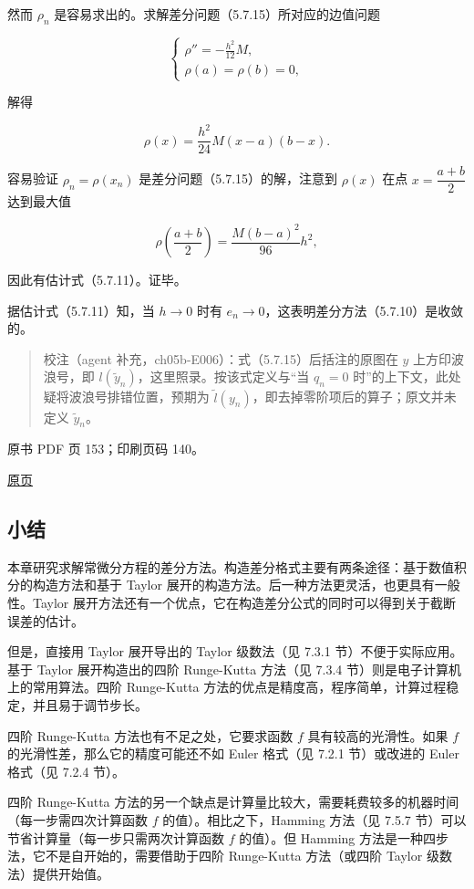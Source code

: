 然而 \(\rho_n\) 是容易求出的。求解差分问题（5.7.15）所对应的边值问题

\[
\begin{cases}
\displaystyle\rho''=-\frac{h^2}{12}M,\\[6pt]
\rho(a)=\rho(b)=0,
\end{cases}
\]

解得

\[
\rho(x)=\frac{h^2}{24}M(x-a)(b-x).
\]

容易验证 \(\rho_n=\rho(x_n)\) 是差分问题（5.7.15）的解，注意到 \(\rho(x)\) 在点 \(x=\dfrac{a+b}2\) 达到最大值

\[
\rho\left(\frac{a+b}2\right)=\frac{M(b-a)^2}{96}h^2,
\]

因此有估计式（5.7.11）。证毕。

据估计式（5.7.11）知，当 \(h\to0\) 时有 \(e_n\to0\)，这表明差分方法（5.7.10）是收敛的。

\begin{quote}
校注（agent 补充，ch05b-E006）：式（5.7.15）后括注的原图在 \(y\) 上方印波浪号，即 \(l(\tilde y_n)\)，这里照录。按该式定义与``当 \(q_n=0\) 时''的上下文，此处疑将波浪号排错位置，预期为 \(\tilde l(y_n)\)，即去掉零阶项后的算子；原文并未定义 \(\tilde y_n\)。
\end{quote}

\clearpage

原书 PDF 页 153；印刷页码 140。

\href{source-images/pdf-153.jpeg}{原页}

\subsection{小结}\label{ch05b-ux5c0fux7ed3}

本章研究求解常微分方程的差分方法。构造差分格式主要有两条途径：基于数值积分的构造方法和基于 Taylor 展开的构造方法。后一种方法更灵活，也更具有一般性。Taylor 展开方法还有一个优点，它在构造差分公式的同时可以得到关于截断误差的估计。

但是，直接用 Taylor 展开导出的 Taylor 级数法（见 7.3.1 节）不便于实际应用。基于 Taylor 展开构造出的四阶 Runge-Kutta 方法（见 7.3.4 节）则是电子计算机上的常用算法。四阶 Runge-Kutta 方法的优点是精度高，程序简单，计算过程稳定，并且易于调节步长。

四阶 Runge-Kutta 方法也有不足之处，它要求函数 \(f\) 具有较高的光滑性。如果 \(f\) 的光滑性差，那么它的精度可能还不如 Euler 格式（见 7.2.1 节）或改进的 Euler 格式（见 7.2.4 节）。

四阶 Runge-Kutta 方法的另一个缺点是计算量比较大，需要耗费较多的机器时间（每一步需四次计算函数 \(f\) 的值）。相比之下，Hamming 方法（见 7.5.7 节）可以节省计算量（每一步只需两次计算函数 \(f\) 的值）。但 Hamming 方法是一种四步法，它不是自开始的，需要借助于四阶 Runge-Kutta 方法（或四阶 Taylor 级数法）提供开始值。

